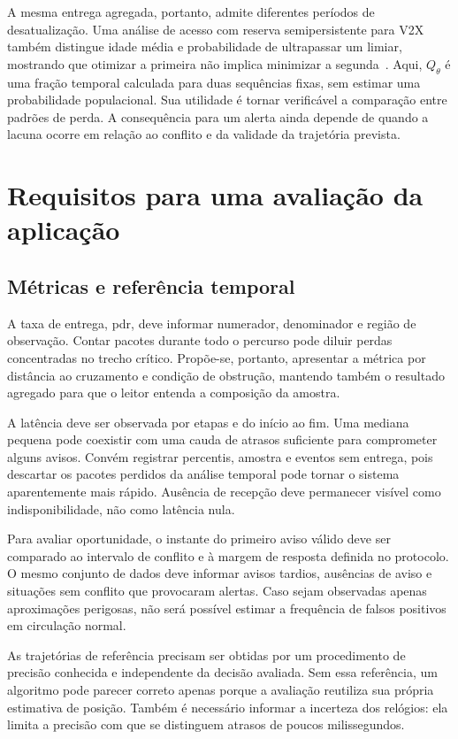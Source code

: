 \documentclass[conference,a4paper]{IEEEtran}
\newcommand{\changed}[1]{{#1}}
\begin{document}
\changed{A mesma entrega agregada, portanto, admite diferentes períodos de desatualização. Uma análise de acesso com reserva semipersistente para V2X também distingue idade média e probabilidade de ultrapassar um limiar, mostrando que otimizar a primeira não implica minimizar a segunda~\cite{bezmenov2024}. Aqui, $Q_\theta$ é uma fração temporal calculada para duas sequências fixas, sem estimar uma probabilidade populacional. Sua utilidade é tornar verificável a comparação entre padrões de perda. A consequência para um alerta ainda depende de quando a lacuna ocorre em relação ao conflito e da validade da trajetória prevista.}

\section{Requisitos para uma avaliação da aplicação}
\subsection{Métricas e referência temporal}
A taxa de entrega, \ac{pdr}, deve informar numerador, denominador e região de observação. Contar pacotes durante todo o percurso pode diluir perdas concentradas no trecho crítico. Propõe-se, portanto, apresentar a métrica por distância ao cruzamento e condição de obstrução, mantendo também o resultado agregado para que o leitor entenda a composição da amostra.

A latência deve ser observada por etapas e do início ao fim. Uma mediana pequena pode coexistir com uma cauda de atrasos suficiente para comprometer alguns avisos. Convém registrar percentis, amostra e eventos sem entrega, pois descartar os pacotes perdidos da análise temporal pode tornar o sistema aparentemente mais rápido. Ausência de recepção deve permanecer visível como indisponibilidade, não como latência nula.

Para avaliar oportunidade, o instante do primeiro aviso válido deve ser comparado ao intervalo de conflito e à margem de resposta definida no protocolo. O mesmo conjunto de dados deve informar avisos tardios, ausências de aviso e situações sem conflito que provocaram alertas. Caso sejam observadas apenas aproximações perigosas, não será possível estimar a frequência de falsos positivos em circulação normal.

As trajetórias de referência precisam ser obtidas por um procedimento de precisão conhecida e independente da decisão avaliada. Sem essa referência, um algoritmo pode parecer correto apenas porque a avaliação reutiliza sua própria estimativa de posição. Também é necessário informar a incerteza dos relógios: ela limita a precisão com que se distinguem atrasos de poucos milissegundos.
\end{document}
